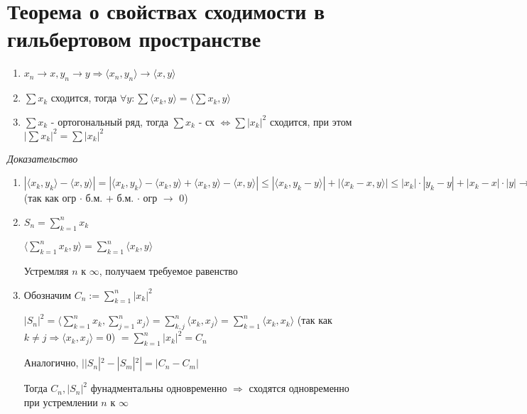 \documentclass[paper=a4, fontsize=17pt]{article}
\begin{document}
\section{Теорема о свойствах сходимости в гильбертовом пространстве}
\begin{enumerate}
	\item $x_n \rightarrow x, y_n \rightarrow y \Rightarrow \langle x_n, y_n \rangle \rightarrow \langle x, y \rangle$

	\item $\sum x_k$ сходится, тогда $\forall y: \sum \langle x_k, y \rangle = \langle \sum x_k, y \rangle$

	\item $\sum x_k$ - ортогональный ряд, тогда $\sum x_k$ - сх $\Leftrightarrow \sum |x_k|^2$ сходится, при этом $|\sum x_k|^2 = \sum |x_k|^2$

\end{enumerate}

\emph{Доказательство}

\begin{enumerate}
	\item $|\langle x_k, y_k \rangle - \langle x, y \rangle| = |\langle x_k, y_k \rangle - \langle x_k, y\rangle  + \langle x_k, y\rangle  - \langle x, y\rangle | \leqslant |\langle x_k, y_k - y\rangle | + |\langle x_k - x, y\rangle | \leqslant |x_k| \cdot |y_k - y| + |x_k - x| \cdot |y| \rightarrow 0$ (так как огр $\cdot$ б.м. +  б.м. $\cdot$ огр $\rightarrow$ 0)

	\item $S_n = \sum\limits_{k = 1}^{n} x_k$

	$\langle \sum\limits_{k = 1}^n x_k, y\rangle  = \sum\limits_{k = 1}^n \langle x_k, y\rangle $

	Устремляя $n$ к $\infty$, получаем требуемое равенство

	\item Обозначим $C_n := \sum\limits_{k = 1}^n |x_k|^2$

	 $|S_n|^2 = \langle \sum\limits_{k = 1}^n x_k, \sum\limits_{j = 1}^n x_j\rangle  = \sum\limits_{k, j}^n \langle x_k, x_j\rangle  = \sum\limits_{k = 1}^n \langle x_k, x_k\rangle $ (так как $k \neq j \Rightarrow \langle x_k, x_j\rangle  = 0$) $= \sum\limits_{k = 1}^n |x_k|^2 = C_n$

	 Аналогично, $||S_n|^2 - |S_m|^2| = |C_n - C_m|$

	 Тогда $C_n, |S_n|^2$ фунадментальны одновременно $\Rightarrow$ сходятся одновременно при устремлении $n$ к $\infty$
\end{enumerate}
\end{document}
